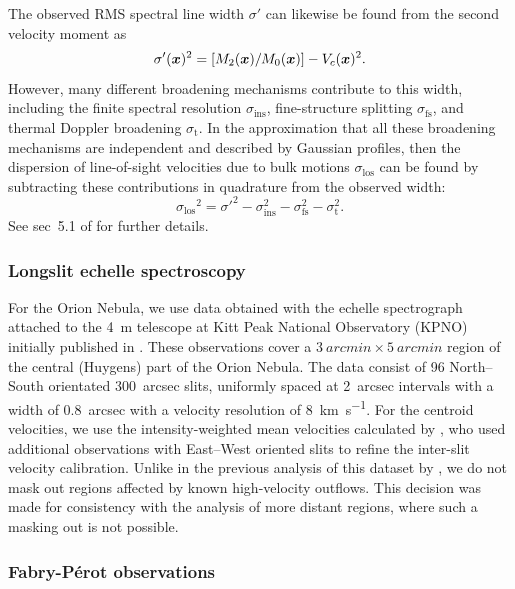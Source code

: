 \documentclass[fleqn,usenatbib, useAMS, a4paper]{mnras}
\newcommand\los{\ensuremath{_{\mathrm{los}}}}
\begin{document}
The observed RMS spectral line width \(\sigma'\) can likewise be found from
the second velocity moment as
\begin{equation}
  \label{eq:observed-sigma}
  \sigma'(\boldsymbol{x})^2  = [M_2(\boldsymbol{x}) / M_0(\boldsymbol{x})] - V_{c}(\boldsymbol{x})^2 .
\end{equation}
However, many different broadening mechanisms contribute to this width,
including the finite spectral resolution \(\sigma_{\mathrm{ins}}\),
fine-structure splitting \(\sigma_{\mathrm{fs}}\),
and thermal Doppler broadening \(\sigma_{\mathrm{t}}\).
In the approximation that all these broadening mechanisms are independent
and described by Gaussian profiles, then the dispersion of
line-of-sight velocities due to bulk motions \(\sigma\los\) can be found
by subtracting these contributions in quadrature from the observed width:
\begin{equation}
  \label{eq:sigma-los}
  \sigma\los^2 = \sigma'^2 - \sigma_{\mathrm{ins}}^2 - \sigma_{\mathrm{fs}}^2 - \sigma_{\mathrm{t}}^2 .
\end{equation}
See sec~5.1 of \citet{Garcia-Diaz:2008a} for further details.

\subsubsection{Longslit echelle spectroscopy}
\label{sec:longsl-echelle-spect}

For the Orion Nebula, we use data obtained with the echelle spectrograph attached to the \SI{4}{m} telescope at Kitt Peak National Observatory (KPNO) initially published in
\citet{Doi:2004a}.
These observations cover a \(\SI{3}{arcmin} \times \SI{5}{arcmin}\) region of the
central (Huygens) part of the Orion Nebula.
The data consist of 96 North--South orientated \SI{300}{arcsec} slits,
uniformly spaced at \SI{2}{arcsec} intervals with a width of \SI{0.8}{arcsec}
with a velocity resolution of \SI{8}{km.s^{-1}}. 
For the centroid velocities, we use the intensity-weighted 
mean velocities calculated by \citet{Garcia-Diaz:2008a},
who used additional observations with East--West oriented slits
to refine the inter-slit velocity calibration. 
Unlike in the previous analysis of this dataset by \citet{arthur2016turbulence},
we do not mask out regions affected by known high-velocity outflows.
This decision was made for consistency with the analysis of more distant regions,
where such a masking out is not possible.

\subsubsection{Fabry-Pérot observations}
\label{sec:fabry-perot-etalaon}
\end{document}
